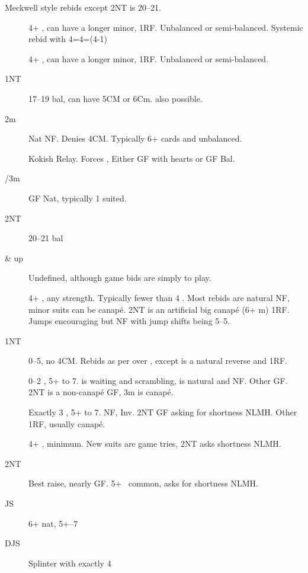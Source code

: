 \documentclass[tom-ari]{subfile}
\begin{document}
	
	Meckwell style rebids except 2NT is 20--21.
	
	\begin{boxbid}{}
		\begin{description}	
		\item[] 4+ \heartsuit, can have a longer minor, 1RF.  Unbalanced or semi-balanced. Systemic rebid with 4=4=(4-1)
		\item[] 4+ \spadesuit, can have a longer minor, 1RF.  Unbalanced or semi-balanced.
		\item[1NT] 17--19 bal, can have 5CM or 6Cm.   also possible.
		\item[2m] Nat NF.  Denies 4CM.  Typically 6+ cards and unbalanced.
		\item[] Kokish Relay.  Forces , Either GF with hearts or GF Bal.
		\item[/3m] GF Nat, typically 1 suited.
		\item[2NT] 20--21 bal
		\item[ \& up] Undefined, although game bids are simply to play.

		\end{description}
	\end{boxbid}


	\begin{boxbid}{}
	\begin{description}
		\item[] 4+ \spadesuit, any strength.  Typically fewer than 4 \heartsuit.  Most rebids are natural NF, minor suits can be canap\'e. 2NT is an artificial big canap\'e (6+ m) 1RF.  Jumps encouraging but NF with jump shifts being 5--5. 
		\item[1NT] 0--5, no 4CM.  Rebids as per over , except  is a natural reverse and 1RF.
		\item[] 0--2 \heartsuit, 5+ to 7.   is waiting and scrambling,  is natural and NF. Other GF.  2NT is a non-canap\'e GF, 3m is canap\'e.
		\item[] Exactly 3 \heartsuit, 5+ to 7.  NF,  Inv.  2NT GF asking for shortness NLMH. Other 1RF, usually canap\'e.
		\item[] 4+ \heartsuit, minimum. New suits are game tries, 2NT asks shortness NLMH.
		\item[2NT] Best raise, nearly GF.  5+ \heartsuit ~common,  asks for shortness NLMH.
		\item[JS] 6+ nat, 5+--7
		\item[DJS] Splinter with exactly 4\heartsuit		
	\end{description}
	\end{boxbid}
	
\end{document}
